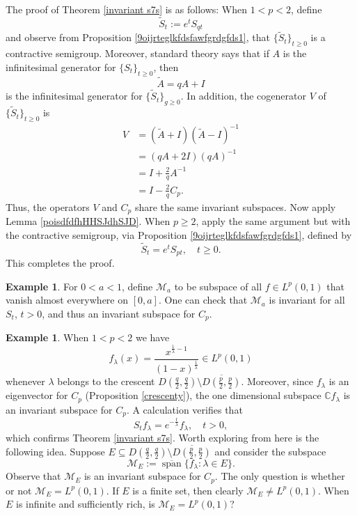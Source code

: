 \documentclass[11pt]{amsart}
\numberwithin{equation}{section}
\theoremstyle{plain}
\theoremstyle{definition}
\newtheorem{Example}[equation]{Example}
\def\C{\mathbb{C}}
\renewcommand{\geq}{\geqslant}
\renewcommand{\subset}{\subseteq}
\newcommand{\0}{{\color{lightgray}0}}
\begin{document}
The proof of Theorem \ref{invariant s7s} is as follows: When $1 < p < 2$, define 
$$\widetilde{S}_{t} := e^{t} S_{q t}$$ and observe from Proposition \ref{9oijrteglkfdsfawfgrdgfds1}, that $\{\widetilde{S}_t\}_{t \geq 0}$ is a contractive semigroup. Moreover, standard theory says that if $A$ is the infinitesimal generator for $\{S_t\}_{t \geq 0}$, then 
$$\widetilde{A} = q A + I$$ is the infinitesimal generator for $\{\widetilde{S}_{t}\}_{g \geq 0}$. In addition, the cogenerator $V$ of $\{\widetilde{S}_{t}\}_{t \geq 0}$  is 
\begin{align*}
V & = (\widetilde{A} + I)(\widetilde{A} - I)^{-1}\\
& = (q A + 2 I)(q A)^{-1}\\
& = I + \tfrac{2}{q} A^{-1}\\
& = I - \tfrac{2}{q} C_{p}.
\end{align*}
Thus, the operators $V$ and $C_{p}$ share the same invariant subspaces. Now apply Lemma \ref{poisdfdfhHHSJdhSJD}.
When $p \geq 2$, apply the same argument but with the contractive semigroup, via Proposition \ref{9oijrteglkfdsfawfgrdgfds1}, defined by 
$$\widetilde{S}_t = e^{t} S_{p t}, \quad t \geq 0.$$ This completes the proof. 

\begin{Example}
For $0 < a < 1$, define $\mathcal{M}_a$ to be subspace of all $f \in L^p(0, 1)$  that  vanish almost everywhere on $[0, a]$. One can check that $\mathcal{M}_{a}$ is invariant for all $S_t$, $t > 0$, and thus an invariant subspace for $C_p$. 
\end{Example}

\begin{Example}
When $1 < p < 2$ we have 
$$f_{\lambda}(x) = \frac{x^{\frac{1}{\lambda} - 1}}{(1 - x)^{\frac{1}{\lambda}}} \in L^p(0, 1)$$ whenever $\lambda$ belongs to the crescent $D(\frac{q}{2}, \frac{q}{2}) \setminus \overline{D(\frac{p}{2}, \frac{p}{2})}$. Moreover, since $f_{\lambda}$ is an eigenvector for $C_p$  (Proposition \ref{crescenty}), the one dimensional subspace $\C f_{\lambda}$ is an invariant subspace for $C_p$. A calculation verifies that 
$$S_{t} f_{\lambda} = e^{-\frac{t}{\lambda}} f_{\lambda}, \quad t > 0,$$
which confirms Theorem \ref{invariant s7s}. Worth exploring from here is the following idea. Suppose $E \subset D(\frac{q}{2}, \frac{q}{2}) \setminus \overline{D(\frac{p}{2}, \frac{p}{2})}$ and consider the subspace 
$$\mathcal{M}_{E} := \overline{\operatorname{span}}\{f_{\lambda}: \lambda \in E\}.$$ Observe that $\mathcal{M}_{E}$ is an invariant subspace for $C_p$. The only question is whether or not $\mathcal{M}_{E} = L^p(0, 1)$. If $E$ is a finite set, then clearly $\mathcal{M}_{E} \not = L^p(0, 1)$. When $E$ is infinite and sufficiently rich, is $\mathcal{M}_{E} = L^p(0, 1)$? 
\end{Example}
\end{document}
